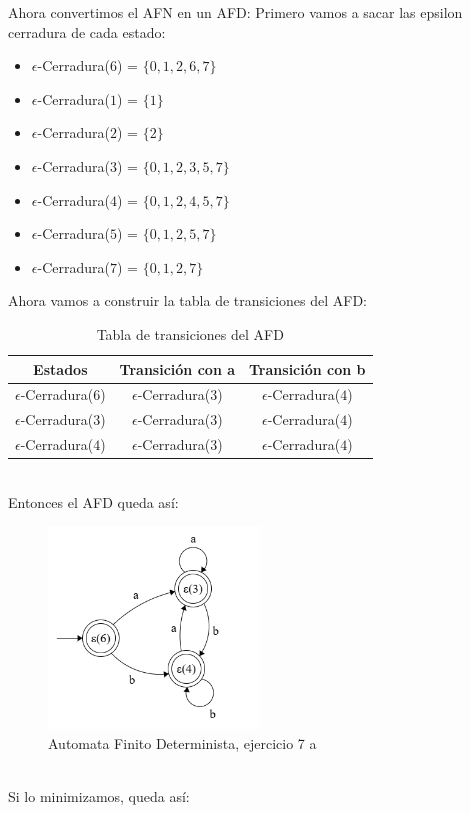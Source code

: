 \begin{enumerate}
    Ahora convertimos el AFN en un AFD:
    Primero vamos a sacar las epsilon cerradura de cada estado:
    \begin{itemize}
        \item $\epsilon$-Cerradura($6$) = $\{0,1,2,6,7\}$
        \item $\epsilon$-Cerradura($1$) = $\{1\}$
        \item $\epsilon$-Cerradura($2$) = $\{2\}$
        \item $\epsilon$-Cerradura($3$) = $\{0,1,2,3,5,7\}$
        \item $\epsilon$-Cerradura($4$) = $\{0,1,2,4,5,7\}$
        \item $\epsilon$-Cerradura($5$) = $\{0,1, 2, 5, 7\}$
        \item $\epsilon$-Cerradura($7$) = $\{0,1,2, 7\}$
    \end{itemize}
    \newpage
    Ahora vamos a construir la tabla de transiciones del AFD:\\
    \begin{table}[h!]        
    \centering
    \begin{tabular}{|c|c|c|}
    \hline
    \textbf{Estados} & \textbf{Transición con a} & \textbf{Transición con b } \\
    \hline
    $\epsilon$-Cerradura($6$) &$\epsilon$-Cerradura($3$) & $\epsilon$-Cerradura($4$)\\
    \hline      
    $\epsilon$-Cerradura($3$) & $\epsilon$-Cerradura($3$) & $\epsilon$-Cerradura($4$) \\
    \hline 
    $\epsilon$-Cerradura($4$) & $\epsilon$-Cerradura($3$) & $\epsilon$-Cerradura($4$) \\
    \hline
    \end{tabular}
    \caption{Tabla de transiciones del AFD} 
    \end{table}\\
    Entonces el AFD queda así:\\
    \begin{figure}[h!]
        \centering
        \includegraphics[width=0.5\textwidth]{images/7aDFA.png}
        \caption{Automata Finito Determinista, ejercicio 7 a}
    \end{figure}\\
    Si lo minimizamos, queda así:


\end{enumerate}
